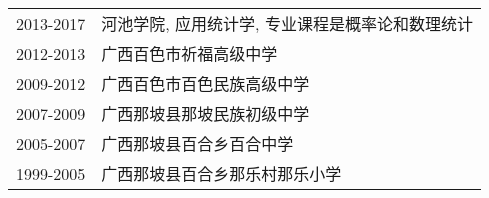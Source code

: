 \begin{tabular}{ll}
  2013-2017 & 河池学院, 应用统计学, 专业课程是概率论和数理统计 \\
  2012-2013 & 广西百色市祈福高级中学 \\
  2009-2012 & 广西百色市百色民族高级中学  \\
  2007-2009 & 广西那坡县那坡民族初级中学  \\
  2005-2007 & 广西那坡县百合乡百合中学  \\
  1999-2005 & 广西那坡县百合乡那乐村那乐小学 \\
\end{tabular}
